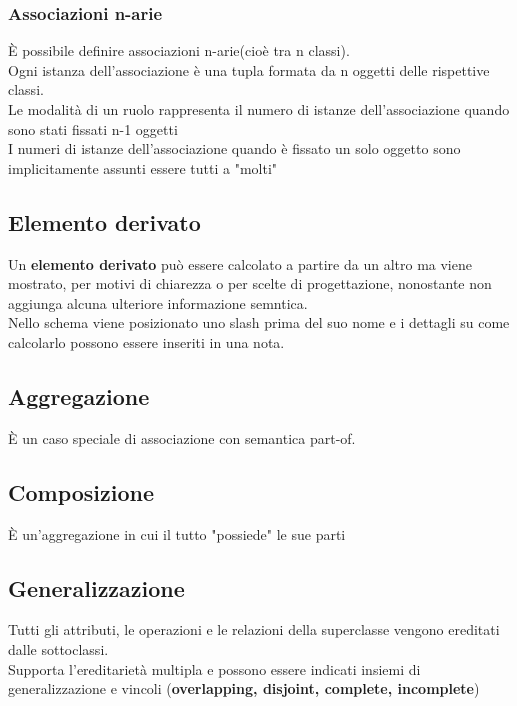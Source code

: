\documentclass{report}
\begin{document}
                \subsubsection{Associazioni n-arie}
                    È possibile definire associazioni n-arie(cioè tra n classi).
                    \\
                    Ogni istanza dell'associazione è una tupla formata da n oggetti delle rispettive classi.
                    \\
                    Le modalità di un ruolo rappresenta il numero di istanze dell'associazione quando sono stati fissati n-1 oggetti
                    \\
                    I numeri di istanze dell'associazione quando è fissato un solo oggetto sono implicitamente assunti essere tutti a "molti"
            \subsection{Elemento derivato}
                Un \textbf{elemento derivato} può essere calcolato a partire da un altro ma viene mostrato, per motivi di chiarezza o per scelte di progettazione, nonostante non aggiunga alcuna ulteriore informazione semntica.
                \\
                Nello schema viene posizionato uno slash prima del suo nome e i dettagli su come calcolarlo possono essere inseriti in una nota.
            \subsection{Aggregazione}
                È un caso speciale di associazione con semantica part-of.
            \subsection{Composizione}
                È un'aggregazione in cui il tutto "possiede" le sue parti
            \subsection{Generalizzazione}
                Tutti gli attributi, le operazioni e le relazioni della superclasse vengono ereditati dalle sottoclassi.
                \\
                Supporta l'ereditarietà multipla e possono essere indicati insiemi di generalizzazione e vincoli (\textbf{overlapping, disjoint, complete, incomplete})
\end{document}
